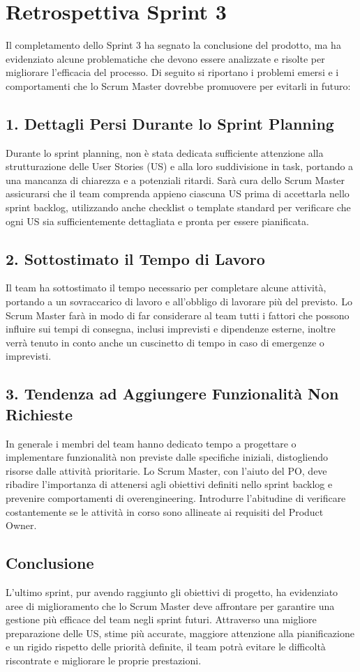 \documentclass[a4paper,12pt]{article}
\begin{document}
\section*{Retrospettiva Sprint 3}

Il completamento dello Sprint 3 ha segnato la conclusione del prodotto, ma ha evidenziato alcune problematiche che devono essere analizzate e risolte per migliorare l’efficacia del processo. Di seguito si riportano i problemi emersi e i comportamenti che lo Scrum Master dovrebbe promuovere per evitarli in futuro:

\subsection*{1. \textbf{Dettagli Persi Durante lo Sprint Planning}}
Durante lo sprint planning, non è stata dedicata sufficiente attenzione alla strutturazione delle User Stories (US) e alla loro suddivisione in task, portando a una mancanza di chiarezza e a potenziali ritardi.
Sarà cura dello Scrum Master assicurarsi che il team comprenda appieno ciascuna US prima di accettarla nello sprint backlog, utilizzando anche checklist o template standard per verificare che ogni US sia sufficientemente dettagliata e pronta per essere pianificata.

\subsection*{2. \textbf{Sottostimato il Tempo di Lavoro}}
Il team ha sottostimato il tempo necessario per completare alcune attività, portando a un sovraccarico di lavoro e all’obbligo di lavorare più del previsto.
Lo Scrum Master farà in modo di far considerare al team tutti i fattori che possono influire sui tempi di consegna, inclusi imprevisti e dipendenze esterne, inoltre verrà tenuto in conto anche un cuscinetto di tempo in caso di emergenze o imprevisti.


\subsection*{3. \textbf{Tendenza ad Aggiungere Funzionalità Non Richieste}}
In generale i membri del team hanno dedicato tempo a progettare o implementare funzionalità non previste dalle specifiche iniziali, distogliendo risorse dalle attività prioritarie.
 Lo Scrum Master, con l’aiuto del PO, deve ribadire l’importanza di attenersi agli obiettivi definiti nello sprint backlog e prevenire comportamenti di overengineering.
 Introdurre l’abitudine di verificare costantemente se le attività in corso sono allineate ai requisiti del Product Owner.

\subsection*{Conclusione}
L’ultimo sprint, pur avendo raggiunto gli obiettivi di progetto, ha evidenziato aree di miglioramento che lo Scrum Master deve affrontare per garantire una gestione più efficace del team negli sprint futuri. Attraverso una migliore preparazione delle US, stime più accurate, maggiore attenzione alla pianificazione e un rigido rispetto delle priorità definite, il team potrà evitare le difficoltà riscontrate e migliorare le proprie prestazioni.
\end{document}
